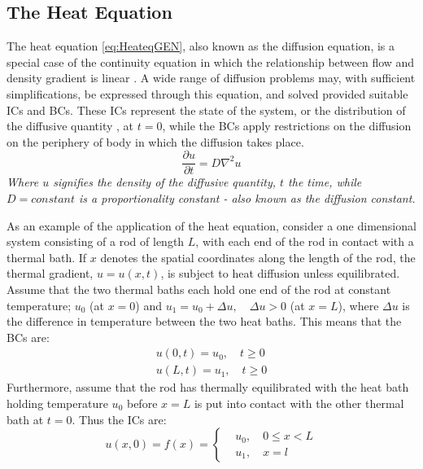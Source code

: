 \documentclass[%
oneside,                 %
final,                   %
10pt]{article}
\begin{document}
\subsection{The Heat Equation}
\label{M.1DHQ}
The heat equation \eqref{eq:HeateqGEN}, also known as the diffusion equation, is a special case of the continuity equation in which the relationship between flow and density gradient is linear \citep{HJ15}. A wide range of diffusion problems may, with sufficient simplifications, be expressed through this equation, and solved provided suitable ICs and BCs. These ICs represent the state of the system, or the distribution of the diffusive quantity , at $t=0$, while the BCs apply restrictions on the diffusion on the periphery of body in which the diffusion takes place.\newline
\begin{equation}
\frac{\partial u}{\partial t}=D \nabla^2 u
\label{eq:HeateqGEN}
\end{equation}
\textit{Where $u$ signifies the density of the diffusive quantity, $t$ the time, while $D=constant$ is a proportionality constant -  also known as the diffusion constant. } \newline

As an example of the application of the heat equation, consider a one dimensional system consisting of a rod of length $L$, with each end of the rod in contact with a thermal bath.  If $x$ denotes the spatial coordinates along the length of the rod, the thermal gradient, $u=u(x,t)$, is subject to heat diffusion unless equilibrated. Assume that the two thermal baths each hold one end of the rod at constant temperature; $u_0$ (at $x=0$) and $u_1=u_0 +\Delta u, \quad \Delta u>0$ (at $x=L$), where $\Delta u$ is the difference in temperature between the two heat baths. This means that the BCs are:
\begin{align}
u(0,t)=u_0, \quad t \geq 0 \\
u(L,t)=u_1, \quad t \geq 0
\end{align}
Furthermore, assume that the rod has thermally equilibrated with the heat bath holding temperature $u_0$ before $x=L$ is put into contact with the other thermal bath at $t=0$. Thus the ICs are:
\begin{equation}
u(x,0)=f(x)=  \begin{cases}
 & u_0, \quad 0\leq x < L\\
 & u_1, \quad x=l
  \end{cases}
\end{equation}
\end{document}
